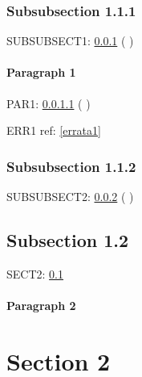 \documentclass[a4paper,12pt]{report}
\makeatletter
\newcommand{\getCurrentSectionNumber}{%
  \ifnum\c@section=0 %
  \thechapter
  \else
  \ifnum\c@subsection=0 %
  \thesection
  \else
  \ifnum\c@subsubsection=0 %
  \thesubsection
  \else
  \thesubsubsection
  \fi
  \fi
  \fi
}
\makeatother
\begin{document}
\subsubsection{Subsubsection 1.1.1}\label{subsubsect-one}


SUBSUBSECT1: \cref{subsubsect-one} (\getCurrentSectionNumber)

\paragraph{Paragraph 1}\label{par-one}


PAR1: \cref{par-one}  (\getCurrentSectionNumber)


ERR1 ref: \ref{errata1}


\subsubsection{Subsubsection 1.1.2}\label{subsubsect-two}


SUBSUBSECT2: \cref{subsubsect-two} (\getCurrentSectionNumber)


\subsection{Subsection 1.2}\label{subsect-two}

SECT2: \cref{subsect-two}




\paragraph*{Paragraph 2}\label{par-two}




\section{Section 2}\label{sect-two}
\end{document}
